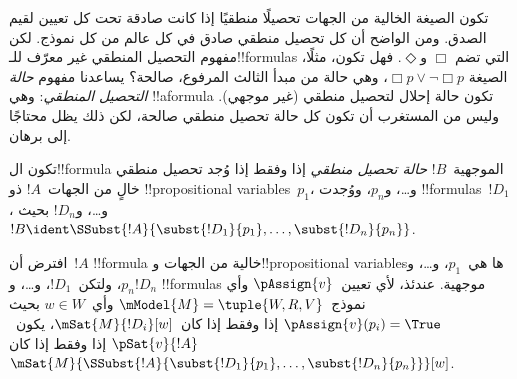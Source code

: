 \documentclass[../../../include/open-logic-section]{subfiles}
\begin{document}


\begin{explain}
تكون الصيغة الخالية من الجهات تحصيلًا منطقيًا إذا كانت صادقة تحت كل
تعيين لقيم الصدق. ومن الواضح أن كل تحصيل منطقي صادق في كل عالم من كل
نموذج. لكن مفهوم التحصيل المنطقي غير معرّف للـ!!{formula}s التي تضم
$\Box$ و$\Diamond$. فهل تكون، مثلًا، الصيغة
$\Box p \lor \lnot \Box p$، وهي حالة من مبدأ الثالث المرفوع، صالحة؟
يساعدنا مفهوم 
\emph{حالة التحصيل المنطقي}: وهي !!a{formula} تكون حالة إحلال لتحصيل
منطقي (غير موجهي). وليس من المستغرب أن تكون كل حالة تحصيل منطقي
صالحة، لكن ذلك يظل محتاجًا إلى برهان.
\end{explain}

\begin{defn}
  تكون ال!!{formula} الموجهية~$!B$ \emph{حالة تحصيل منطقي} إذا وفقط
  إذا وُجد تحصيل منطقي خالٍ من الجهات~$!A$ ذو !!{propositional
    variable}s~$p_1$، و\dots، و$p_n$، ووُجدت !!{formula}s~$!D_1$،
  و\dots، و$!D_n$ بحيث
  $!B \ident \SSubst{!A}{\subst{!D_1}{p_1},
    \dots, \subst{!D_n}{p_n}}$.
\end{defn}

\begin{lem}
  افترض أن~$!A$ !!{formula} خالية من الجهات و!!{propositional
  variable}sها هي~$p_1$، و\dots، و$p_n$، ولتكن~$!D_1$، و\dots،
  و$!D_n$ !!{formula}s موجهية. عندئذ، لأي تعيين~$\pAssign{v}$ وأي
  نموذج~$\mModel{M} = \tuple{W, R, V}$ وأي~$w \in W$ بحيث
  $\pAssign{v}(p_i) = \True$ إذا وفقط إذا كان~$\mSat{M}{!D_i}[w]$،
  يكون~$\pSat{v}{!A}$ إذا وفقط إذا كان
  $\mSat{M}{\SSubst{!A}{\subst{!D_1}{p_1}, \dots,
      \subst{!D_n}{p_n}}}[w]$.
\end{lem}
\end{document}
